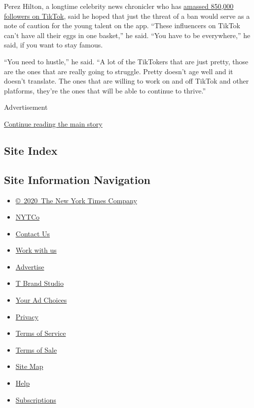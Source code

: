 Perez Hilton, a longtime celebrity news chronicler who has
\href{https://www.tiktok.com/@perezhilton}{amassed 850,000 followers on
TikTok}, said he hoped that just the threat of a ban would serve as a
note of caution for the young talent on the app. ``These influencers on
TikTok can't have all their eggs in one basket,'' he said. ``You have to
be everywhere,'' he said, if you want to stay famous.

``You need to hustle,'' he said. ``A lot of the TikTokers that are just
pretty, those are the ones that are really going to struggle. Pretty
doesn't age well and it doesn't translate. The ones that are willing to
work on and off TikTok and other platforms, they're the ones that will
be able to continue to thrive.''

Advertisement

\protect\hyperlink{after-bottom}{Continue reading the main story}

\hypertarget{site-index}{%
\subsection{Site Index}\label{site-index}}

\hypertarget{site-information-navigation}{%
\subsection{Site Information
Navigation}\label{site-information-navigation}}

\begin{itemize}
\tightlist
\item
  \href{https://help.nytimes.com/hc/en-us/articles/115014792127-Copyright-notice}{©~2020~The
  New York Times Company}
\end{itemize}

\begin{itemize}
\tightlist
\item
  \href{https://www.nytco.com/}{NYTCo}
\item
  \href{https://help.nytimes.com/hc/en-us/articles/115015385887-Contact-Us}{Contact
  Us}
\item
  \href{https://www.nytco.com/careers/}{Work with us}
\item
  \href{https://nytmediakit.com/}{Advertise}
\item
  \href{http://www.tbrandstudio.com/}{T Brand Studio}
\item
  \href{https://www.nytimes.com/privacy/cookie-policy\#how-do-i-manage-trackers}{Your
  Ad Choices}
\item
  \href{https://www.nytimes.com/privacy}{Privacy}
\item
  \href{https://help.nytimes.com/hc/en-us/articles/115014893428-Terms-of-service}{Terms
  of Service}
\item
  \href{https://help.nytimes.com/hc/en-us/articles/115014893968-Terms-of-sale}{Terms
  of Sale}
\item
  \href{https://spiderbites.nytimes.com}{Site Map}
\item
  \href{https://help.nytimes.com/hc/en-us}{Help}
\item
  \href{https://www.nytimes.com/subscription?campaignId=37WXW}{Subscriptions}
\end{itemize}
